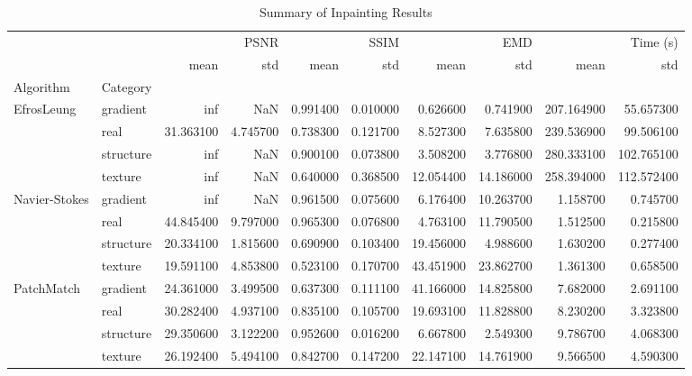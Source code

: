 \begin{table}
\caption{Summary of Inpainting Results}
\label{tab:inpainting_summary}
\begin{tabular}{llrrrrrrrr}
\toprule
 &  & \multicolumn{2}{r}{PSNR} & \multicolumn{2}{r}{SSIM} & \multicolumn{2}{r}{EMD} & \multicolumn{2}{r}{Time (s)} \\
 &  & mean & std & mean & std & mean & std & mean & std \\
Algorithm & Category &  &  &  &  &  &  &  &  \\
\midrule
\multirow[t]{4}{*}{EfrosLeung} & gradient & inf & NaN & 0.991400 & 0.010000 & 0.626600 & 0.741900 & 207.164900 & 55.657300 \\
 & real & 31.363100 & 4.745700 & 0.738300 & 0.121700 & 8.527300 & 7.635800 & 239.536900 & 99.506100 \\
 & structure & inf & NaN & 0.900100 & 0.073800 & 3.508200 & 3.776800 & 280.333100 & 102.765100 \\
 & texture & inf & NaN & 0.640000 & 0.368500 & 12.054400 & 14.186000 & 258.394000 & 112.572400 \\
\cline{1-10}
\multirow[t]{4}{*}{Navier-Stokes} & gradient & inf & NaN & 0.961500 & 0.075600 & 6.176400 & 10.263700 & 1.158700 & 0.745700 \\
 & real & 44.845400 & 9.797000 & 0.965300 & 0.076800 & 4.763100 & 11.790500 & 1.512500 & 0.215800 \\
 & structure & 20.334100 & 1.815600 & 0.690900 & 0.103400 & 19.456000 & 4.988600 & 1.630200 & 0.277400 \\
 & texture & 19.591100 & 4.853800 & 0.523100 & 0.170700 & 43.451900 & 23.862700 & 1.361300 & 0.658500 \\
\cline{1-10}
\multirow[t]{4}{*}{PatchMatch} & gradient & 24.361000 & 3.499500 & 0.637300 & 0.111100 & 41.166000 & 14.825800 & 7.682000 & 2.691100 \\
 & real & 30.282400 & 4.937100 & 0.835100 & 0.105700 & 19.693100 & 11.828800 & 8.230200 & 3.323800 \\
 & structure & 29.350600 & 3.122200 & 0.952600 & 0.016200 & 6.667800 & 2.549300 & 9.786700 & 4.068300 \\
 & texture & 26.192400 & 5.494100 & 0.842700 & 0.147200 & 22.147100 & 14.761900 & 9.566500 & 4.590300 \\
\cline{1-10}
\bottomrule
\end{tabular}
\end{table}
